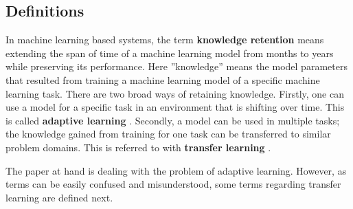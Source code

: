 
\subsection{Definitions}






In machine learning based systems, the term \textbf{knowledge retention} means extending the span of time of a machine learning model from months to years while preserving its performance. Here ''knowledge'' means the model parameters that resulted from training a machine learning model of a specific machine learning task. There are two broad ways of retaining knowledge. Firstly, one can use a model for a specific task in an environment that is shifting over time. This is called \textbf{adaptive learning} \cite{conceptdriftsurvey}. Secondly, a model can be used in multiple tasks; the knowledge gained from training for one task can be transferred to similar problem domains. This is referred to with \textbf{transfer learning} \cite{lmlsystems}.

The paper at hand is dealing with the problem of adaptive learning. However, as terms can be easily confused and misunderstood, some terms regarding transfer learning are defined next.

